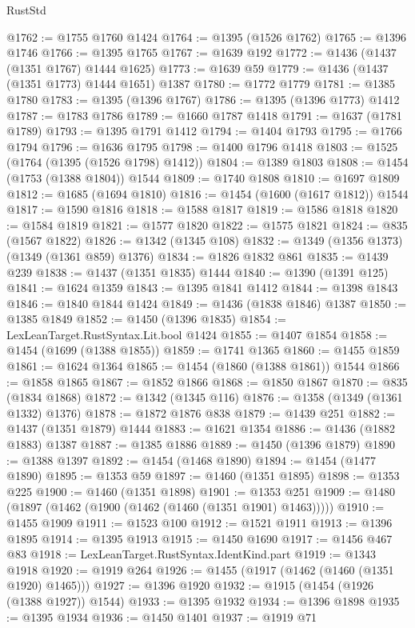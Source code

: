 \begin{lexlean}{RustStd}
\begin{coremodule}
@1762 := @1755 @1760 @1424
@1764 := @1395 (@1526 @1762)
@1765 := @1396 @1746
@1766 := @1395 @1765
@1767 := @1639 @192
@1772 := @1436 (@1437 (@1351 @1767) @1444 @1625)
@1773 := @1639 @59
@1779 := @1436 (@1437 (@1351 @1773) @1444 @1651) @1387
@1780 := @1772 @1779
@1781 := @1385 @1780
@1783 := @1395 (@1396 @1767)
@1786 := @1395 (@1396 @1773) @1412
@1787 := @1783 @1786
@1789 := @1660 @1787 @1418
@1791 := @1637 (@1781 @1789)
@1793 := @1395 @1791 @1412
@1794 := @1404 @1793
@1795 := @1766 @1794
@1796 := @1636 @1795
@1798 := @1400 @1796 @1418
@1803 := @1525 (@1764 (@1395 (@1526 @1798) @1412))
@1804 := @1389 @1803
@1808 := @1454 (@1753 (@1388 @1804)) @1544
@1809 := @1740 @1808
@1810 := @1697 @1809
@1812 := @1685 (@1694 @1810)
@1816 := @1454 (@1600 (@1617 @1812)) @1544
@1817 := @1590 @1816
@1818 := @1588 @1817
@1819 := @1586 @1818
@1820 := @1584 @1819
@1821 := @1577 @1820
@1822 := @1575 @1821
@1824 := @835 (@1567 @1822)
@1826 := @1342 (@1345 @108)
@1832 := @1349 (@1356 @1373) (@1349 (@1361 @859) @1376)
@1834 := @1826 @1832 @861
@1835 := @1439 @239
@1838 := @1437 (@1351 @1835) @1444
@1840 := @1390 (@1391 @125)
@1841 := @1624 @1359
@1843 := @1395 @1841 @1412
@1844 := @1398 @1843
@1846 := @1840 @1844 @1424
@1849 := @1436 (@1838 @1846) @1387
@1850 := @1385 @1849
@1852 := @1450 (@1396 @1835)
@1854 := LexLeanTarget.RustSyntax.Lit.bool @1424
@1855 := @1407 @1854
@1858 := @1454 (@1699 (@1388 @1855))
@1859 := @1741 @1365
@1860 := @1455 @1859
@1861 := @1624 @1364
@1865 := @1454 (@1860 (@1388 @1861)) @1544
@1866 := @1858 @1865
@1867 := @1852 @1866
@1868 := @1850 @1867
@1870 := @835 (@1834 @1868)
@1872 := @1342 (@1345 @116)
@1876 := @1358 (@1349 (@1361 @1332) @1376)
@1878 := @1872 @1876 @838
@1879 := @1439 @251
@1882 := @1437 (@1351 @1879) @1444
@1883 := @1621 @1354
@1886 := @1436 (@1882 @1883) @1387
@1887 := @1385 @1886
@1889 := @1450 (@1396 @1879)
@1890 := @1388 @1397
@1892 := @1454 (@1468 @1890)
@1894 := @1454 (@1477 @1890)
@1895 := @1353 @59
@1897 := @1460 (@1351 @1895)
@1898 := @1353 @225
@1900 := @1460 (@1351 @1898)
@1901 := @1353 @251
@1909 := @1480 (@1897 (@1462 (@1900 (@1462 (@1460 (@1351 @1901) @1463)))))
@1910 := @1455 @1909
@1911 := @1523 @100
@1912 := @1521 @1911
@1913 := @1396 @1895
@1914 := @1395 @1913
@1915 := @1450 @1690
@1917 := @1456 @467 @83
@1918 := LexLeanTarget.RustSyntax.IdentKind.part
@1919 := @1343 @1918
@1920 := @1919 @264
@1926 := @1455 (@1917 (@1462 (@1460 (@1351 @1920) @1465)))
@1927 := @1396 @1920
@1932 := @1915 (@1454 (@1926 (@1388 @1927)) @1544)
@1933 := @1395 @1932
@1934 := @1396 @1898
@1935 := @1395 @1934
@1936 := @1450 @1401
@1937 := @1919 @71

\end{coremodule}
\end{lexlean}
